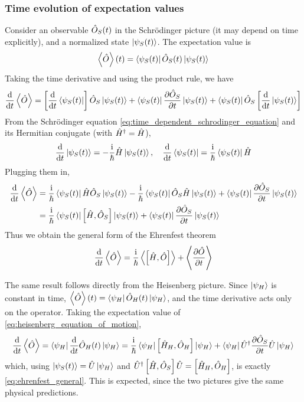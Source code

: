 \subsubsection{Time evolution of expectation values}
Consider an observable $\hat{O}_S(t)$ in the Schrödinger picture (it may depend on time explicitly), and a normalized state $\ket{\psi_S(t)}$. The expectation value is
\begin{align*}
    \left\langle \hat{O} \right\rangle(t) = \bra{\psi_S(t)} \hat{O}_S(t) \ket{\psi_S(t)}
\end{align*}
Taking the time derivative and using the product rule, we have
\begin{align*}
    \frac{\mathrm{d}}{\mathrm{d} t} \left\langle \hat{O} \right\rangle = \left[\frac{\mathrm{d}}{\mathrm{d} t} \bra{\psi_S(t)}\right] \hat{O}_S \ket{\psi_S(t)} + \bra{\psi_S(t)} \frac{\partial \hat{O}_S}{\partial t} \ket{\psi_S(t)} + \bra{\psi_S(t)} \hat{O}_S \left[\frac{\mathrm{d}}{\mathrm{d} t} \ket{\psi_S(t)}\right]
\end{align*}
From the Schrödinger equation \cref{eq:time_dependent_schrodinger_equation} and its Hermitian conjugate (with $\hat{H}^\dag = \hat{H}$),
\begin{align*}
    \frac{\mathrm{d}}{\mathrm{d} t} \ket{\psi_S(t)} = - \frac{\mathrm{i}}{\hbar} \hat{H} \ket{\psi_S(t)}, \quad \frac{\mathrm{d}}{\mathrm{d} t} \bra{\psi_S(t)} = \frac{\mathrm{i}}{\hbar} \bra{\psi_S(t)} \hat{H}
\end{align*}
Plugging them in,
\begin{align*}
    \frac{\mathrm{d}}{\mathrm{d} t} \left\langle \hat{O} \right\rangle &= \frac{\mathrm{i}}{\hbar} \bra{\psi_S(t)} \hat{H} \hat{O}_S \ket{\psi_S(t)} - \frac{\mathrm{i}}{\hbar} \bra{\psi_S(t)} \hat{O}_S \hat{H} \ket{\psi_S(t)} + \bra{\psi_S(t)} \frac{\partial \hat{O}_S}{\partial t} \ket{\psi_S(t)} \\
    &= \frac{\mathrm{i}}{\hbar} \bra{\psi_S(t)} \left[ \hat{H} , \hat{O}_S \right] \ket{\psi_S(t)} + \bra{\psi_S(t)} \frac{\partial \hat{O}_S}{\partial t} \ket{\psi_S(t)}
\end{align*}
Thus we obtain the general form of the Ehrenfest theorem
\begin{align}
    \frac{\mathrm{d}}{\mathrm{d} t} \left\langle \hat{O} \right\rangle = \frac{\mathrm{i}}{\hbar} \left\langle \left[ \hat{H} , \hat{O} \right] \right\rangle + \left\langle \frac{\partial \hat{O}}{\partial t} \right\rangle \label{eq:ehrenfest_general}
\end{align}

The same result follows directly from the Heisenberg picture. Since $\ket{\psi_H}$ is constant in time, $\left\langle \hat{O} \right\rangle(t) = \bra{\psi_H} \hat{O}_H(t) \ket{\psi_H}$, and the time derivative acts only on the operator. Taking the expectation value of \cref{eq:heisenberg_equation_of_motion},
\begin{align*}
    \frac{\mathrm{d}}{\mathrm{d} t} \left\langle \hat{O} \right\rangle = \bra{\psi_H} \frac{\mathrm{d}}{\mathrm{d} t} \hat{O}_H(t) \ket{\psi_H} = \frac{\mathrm{i}}{\hbar} \bra{\psi_H} \left[ \hat{H}_H , \hat{O}_H \right] \ket{\psi_H} + \bra{\psi_H} \hat{U}^\dag \frac{\partial \hat{O}_S}{\partial t} \hat{U} \ket{\psi_H}
\end{align*}
which, using $\ket{\psi_S(t)} = \hat{U} \ket{\psi_H}$ and $\hat{U}^\dag \left[ \hat{H} , \hat{O}_S \right] \hat{U} = \left[ \hat{H}_H , \hat{O}_H \right]$, is exactly \cref{eq:ehrenfest_general}. This is expected, since the two pictures give the same physical predictions.

